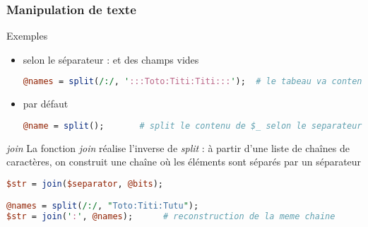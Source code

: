 \begin{frame}[fragile]
  \frametitle{Manipulation de texte}

  \begin{exampleblock}{Exemples}
    \begin{itemize}
    \item selon le séparateur : et des champs vides
      \begin{lstlisting}[language=perl]
@names = split(/:/, ':::Toto:Titi:Titi:::');  # le tabeau va contenir des cases vides
      \end{lstlisting}
    \item par défaut
      \begin{lstlisting}[language=perl]
@name = split();       # split le contenu de $_ selon le separateur espace
      \end{lstlisting}
    \end{itemize}
  \end{exampleblock}

  \begin{alertblock}{\textit{join}}
    La fonction \textit{join} réalise l'inverse de \textit{split} : à
    partir d'une liste de chaînes de caractères, on construit une chaîne où
    les éléments sont séparés par un séparateur
    \begin{lstlisting}[language=perl]
$str = join($separator, @bits);

@names = split(/:/, "Toto:Titi:Tutu");
$str = join(':', @names);      # reconstruction de la meme chaine
    \end{lstlisting}
  \end{alertblock}
\end{frame}
